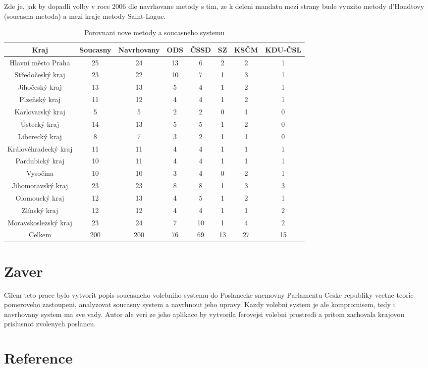 \documentclass[12pt,a4paper]{scrreprt}
\begin{document}
Zde je, jak by dopadli volby v roce 2006 dle navrhovane metody s tim, ze k deleni mandatu mezi strany bude vyuzito metody d'Hondtovy (soucasna metoda) a mezi kraje metody Saint-Lague.
\begin{table}
\begin{tabular}{|c|c|c|c|c|c|c|c|}
\hline
Kraj & Soucasny & Navrhovany & ODS & ČSSD & SZ & KSČM & KDU-ČSL \\ \hline
Hlavní město Praha & 25 & 24 & 13 & 6 & 2 & 2 & 1 \\ \hline
Středočeský kraj & 23 & 22 & 10 & 7 & 1 & 3 & 1 \\ \hline
Jihočeský kraj & 13 & 13 & 5 & 4 & 1 & 2 & 1 \\ \hline
Plzeňský kraj & 11 & 12 & 4 & 4 & 1 & 2 & 1 \\ \hline
Karlovarský kraj & 5 & 5 & 2 & 2 & 0 & 1 & 0 \\ \hline
Ústecký kraj & 14 & 13 & 5 & 5 & 1 & 2 & 0 \\ \hline
Liberecký kraj & 8 & 7 & 3 & 2 & 1 & 1 & 0 \\ \hline
Královéhradecký kraj & 11 & 11 & 4 & 4 & 1 & 1 & 1 \\ \hline
Pardubický kraj & 10 & 11 & 4 & 4 & 1 & 1 & 1 \\ \hline
Vysočina & 10 & 10 & 3 & 4 & 0 & 2 & 1 \\ \hline
Jihomoravský kraj & 23 & 23 & 8 & 8 & 1 & 3 & 3 \\ \hline
Olomoucký kraj & 12 & 13 & 4 & 5 & 1 & 2 & 1 \\ \hline
Zlínský kraj & 12 & 12 & 4 & 4 & 1 & 1 & 2 \\ \hline
Moravskoslezský
kraj & 23 & 24 & 7 & 10 & 1 & 4 & 2 \\ \hline
Celkem  & 200 & 200 & 76 & 69 & 13 & 27 & 15 \\ \hline
\end{tabular}
\caption{Porovnani nove metody a soucasneho systemu}
\end{table}

\section{Zaver}
Cilem teto prace bylo vytvorit popis soucasneho volebniho systemu do Poslanecke snemovny Parlamentu Ceske republiky vcetne teorie pomeroveho zastoupeni, analyzovat soucasny system a navrhnout jeho upravy. Kazdy volebni system je ale kompromisem, tedy i navrhovany system ma sve vady. Autor ale veri ze jeho aplikace by vytvorila ferovejsi volebni prostredi a pritom zachovala krajovou prislusnot zvolenych poslancu.
\section*{Reference}
\printbibliography[heading=none]
\end{document}
